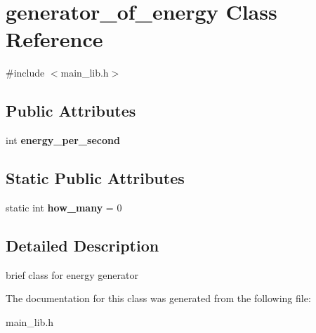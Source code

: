 \hypertarget{classgenerator__of__energy}{}\section{generator\+\_\+of\+\_\+energy Class Reference}
\label{classgenerator__of__energy}


{\ttfamily \#include $<$main\+\_\+lib.\+h$>$}

\subsection*{Public Attributes}
\begin{DoxyCompactItemize}
\item 
\mbox{\label{classgenerator__of__energy_ad193a7482acaa051e7d4afa63e51c06a}} 
int {\bfseries energy\+\_\+per\+\_\+second}
\end{DoxyCompactItemize}
\subsection*{Static Public Attributes}
\begin{DoxyCompactItemize}
\item 
\mbox{\label{classgenerator__of__energy_a5b440fb547e182d49fe94a50b5b86896}} 
static int {\bfseries how\+\_\+many} = 0
\end{DoxyCompactItemize}


\subsection{Detailed Description}
brief class for energy generator 

The documentation for this class was generated from the following file\+:\begin{DoxyCompactItemize}
\item 
main\+\_\+lib.\+h\end{DoxyCompactItemize}

